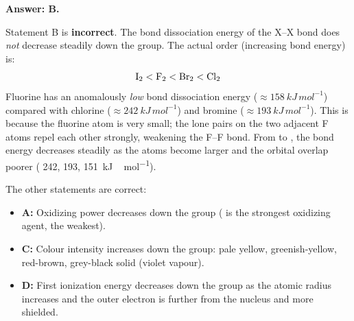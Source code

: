 \documentclass[11pt]{article}
\begin{document}
\begin{corrige}
\textbf{Answer: B.}

Statement B is \textbf{incorrect}. The bond dissociation energy of the X--X bond does \emph{not} decrease steadily down the group. The actual order (increasing bond energy) is:
\[
\ce{I2} < \ce{F2} < \ce{Br2} < \ce{Cl2}
\]
Fluorine has an anomalously \emph{low} bond dissociation energy ($\approx \SI{158}{kJ\,mol^{-1}}$) compared with chlorine ($\approx \SI{242}{kJ\,mol^{-1}}$) and bromine ($\approx \SI{193}{kJ\,mol^{-1}}$). This is because the fluorine atom is very small; the lone pairs on the two adjacent F atoms repel each other strongly, weakening the F--F bond. From  to , the bond energy decreases steadily as the atoms become larger and the orbital overlap poorer ( \num{242},  \num{193},  \SI{151}{kJ\,mol^{-1}}).

The other statements are correct:
\begin{itemize}
\item \textbf{A:} Oxidizing power decreases down the group ( is the strongest oxidizing agent,  the weakest).
\item \textbf{C:} Colour intensity increases down the group:  pale yellow,  greenish-yellow,  red-brown,  grey-black solid (violet vapour).
\item \textbf{D:} First ionization energy decreases down the group as the atomic radius increases and the outer electron is further from the nucleus and more shielded.
\end{itemize}
\end{corrige}
\end{document}
